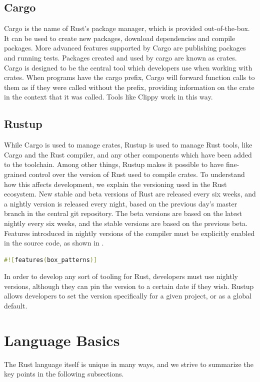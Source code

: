 \documentclass[paper=a4,%
  twoside,%
  BCOR4mm,%
  abstract=true,%
  toc=bibliography,%
  chapterprefix=true,%
  toc=bibliographynumbered,%
  open=right,%
  english,%
  pagesize=pdftex]{scrreprt}
\begin{document}
\subsection{Cargo}
Cargo is the name of Rust’s package manager, which is provided out-of-the-box. It can be used to create new packages, download dependencies and compile packages. More advanced features supported by Cargo are publishing packages and running tests. Packages created and used by cargo are known as crates. Cargo is designed to be the central tool which developers use when working with crates. When programs have the cargo prefix, Cargo will forward function calls to them as if they were called without the prefix, providing information on the crate in the context that it was called. Tools like Clippy work in this way.

\subsection{Rustup}
While Cargo is used to manage crates, Rustup is used to manage Rust tools, like Cargo and the Rust compiler, and any other components which have been added to the toolchain. Among other things, Rustup makes it possible to have fine-grained control over the version of Rust used to compile crates. To understand how this affects development, we explain the versioning used in the Rust ecosystem. New stable and beta versions of Rust are released every six weeks, and a nightly version is released every night, based on the previous day's master branch in the central git repository. The beta versions are based on the latest nightly every six weeks, and the stable versions are based on the previous beta.
Features introduced in nightly versions of the compiler must be explicitly enabled in the source code, as shown in .

\begin{lstlisting}[language=Rust, style=boxed, caption=Enabling features in Rust, label=lst:example-enable-feature]
#![features(box_patterns)]
\end{lstlisting}

In order to develop any sort of tooling for Rust, developers must use nightly versions, although they can pin the version to a certain date if they wish.
Rustup allows developers to set the version specifically for a given project, or as a global default.

\section{Language Basics}
The Rust language itself is unique in many ways, and we strive to summarize the key points in the following subsections.
\end{document}
